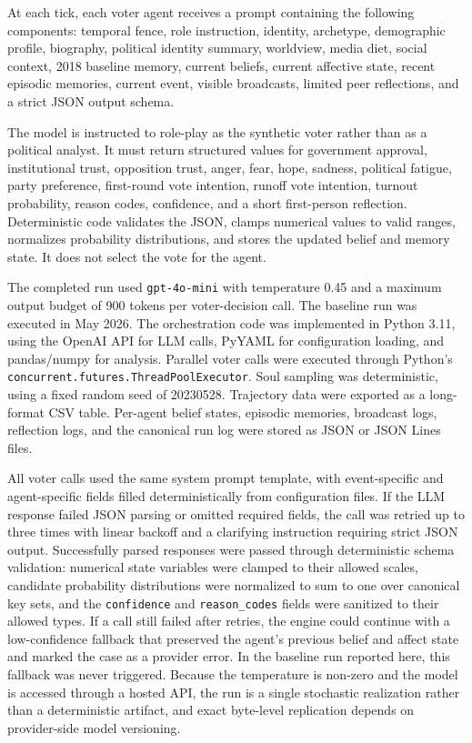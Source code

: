 \documentclass[pdflatex,sn-mathphys-num,iicol]{sn-jnl}
\begin{document}
At each tick, each voter agent receives a prompt containing the following
components: temporal fence, role instruction, identity, archetype, demographic
profile, biography, political identity summary, worldview, media diet, social
context, 2018 baseline memory, current beliefs, current affective state, recent
episodic memories, current event, visible broadcasts, limited peer reflections,
and a strict JSON output schema.

The model is instructed to role-play as the synthetic voter rather than as a
political analyst. It must return structured values for government approval,
institutional trust, opposition trust, anger, fear, hope, sadness, political
fatigue, party preference, first-round vote intention, runoff vote intention,
turnout probability, reason codes, confidence, and a short first-person
reflection. Deterministic code validates the JSON, clamps numerical values to
valid ranges, normalizes probability distributions, and stores the updated
belief and memory state. It does not select the vote for the agent.

The completed run used \texttt{gpt-4o-mini} with temperature 0.45 and a maximum
output budget of 900 tokens per voter-decision call. The baseline run was
executed in May 2026. The orchestration code was implemented in Python 3.11,
using the OpenAI API for LLM calls, PyYAML for configuration loading, and
pandas/numpy for analysis. Parallel voter calls were executed through Python's
\texttt{concurrent.futures.ThreadPoolExecutor}. Soul sampling was deterministic,
using a fixed random seed of 20230528. Trajectory data were exported as a
long-format CSV table. Per-agent belief states, episodic memories, broadcast
logs, reflection logs, and the canonical run log were stored as JSON or JSON
Lines files.

All voter calls used the same system prompt template, with event-specific and
agent-specific fields filled deterministically from configuration files. If the
LLM response failed JSON parsing or omitted required fields, the call was
retried up to three times with linear backoff and a clarifying instruction
requiring strict JSON output. Successfully parsed responses were passed through
deterministic schema validation: numerical state variables were clamped to their
allowed scales, candidate probability distributions were normalized to sum to
one over canonical key sets, and the \texttt{confidence} and
\texttt{reason\_codes} fields were sanitized to their allowed types. If a call
still failed after retries, the engine could continue with a low-confidence
fallback that preserved the agent's previous belief and affect state and marked
the case as a provider error. In the baseline run reported here, this fallback
was never triggered. Because the temperature is non-zero and the model is
accessed through a hosted API, the run is a single stochastic realization rather
than a deterministic artifact, and exact byte-level replication depends on
provider-side model versioning.
\end{document}
